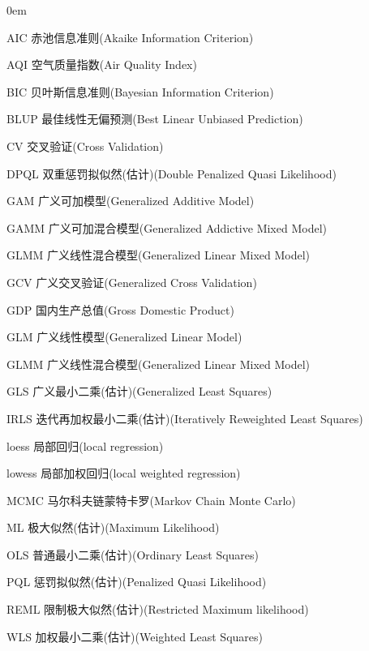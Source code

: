 \begin{denotation}
\itemsep 0em

\item [AIC] 赤池信息准则(Akaike Information Criterion)
\item [AQI] 空气质量指数(Air Quality Index)
\item [BIC] 贝叶斯信息准则(Bayesian Information Criterion)
\item [BLUP] 最佳线性无偏预测(Best Linear Unbiased Prediction)
\item [CV] 交叉验证(Cross Validation)
\item [DPQL] 双重惩罚拟似然(估计)(Double Penalized Quasi Likelihood)
\item [GAM] 广义可加模型(Generalized Additive Model)
\item [GAMM] 广义可加混合模型(Generalized Addictive Mixed Model)
\item [GLMM] 广义线性混合模型(Generalized Linear Mixed Model)
\item [GCV] 广义交叉验证(Generalized Cross Validation)
\item [GDP] 国内生产总值(Gross Domestic Product)
\item [GLM] 广义线性模型(Generalized Linear Model)
\item [GLMM] 广义线性混合模型(Generalized Linear Mixed Model)
\item [GLS] 广义最小二乘(估计)(Generalized Least Squares)
\item [IRLS] 迭代再加权最小二乘(估计)(Iteratively Reweighted Least Squares)
\item [loess] 局部回归(local regression)
\item [lowess] 局部加权回归(local weighted regression)
\item [MCMC] 马尔科夫链蒙特卡罗(Markov Chain Monte Carlo)
\item [ML] 极大似然(估计)(Maximum Likelihood)
\item [OLS] 普通最小二乘(估计)(Ordinary Least Squares)
\item [PQL] 惩罚拟似然(估计)(Penalized Quasi Likelihood)
\item [REML] 限制极大似然(估计)(Restricted Maximum likelihood)
\item [WLS] 加权最小二乘(估计)(Weighted Least Squares)

\end{denotation}

